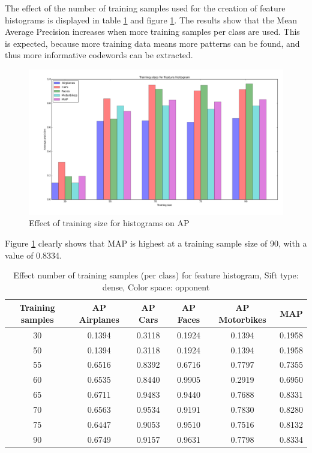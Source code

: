 The effect of the number of training samples used for the creation of feature histograms is displayed in table \ref{tab:size_hist} and figure \ref{fig:size_hist}. The results show that the Mean Average Precision increases when more training samples per class are used. This is expected, because more training data means more patterns can be found, and thus more informative codewords can be extracted.
\begin{figure}[H]
\includegraphics[width=\textwidth]{../plots/training_size_feature_histograms}
\caption{Effect of training size for histograms on AP}
\label{fig:size_hist}
\end{figure}
Figure \ref{fig:size_hist} clearly shows that MAP is highest at a training sample size of 90, with a value of 0.8334.

\begin{table}[H]
\begin{tabular}{|c|ccccc|}
\hline
\textbf{Training samples} & \textbf{AP Airplanes} & \textbf{AP Cars} & \textbf{AP Faces} & \textbf{AP Motorbikes} & \textbf{MAP}\\
\hline
30 & 0.1394 & 0.3118& 0.1924& 0.1394 & 0.1958\\
50 & 0.1394 & 0.3118& 0.1924& 0.1394 & 0.1958\\
55 & 0.6516 & 0.8392 & 0.6716 & 0.7797 & 0.7355\\
60 & 0.6535 & 0.8440 & 0.9905 & 0.2919 & 0.6950\\
65 & 0.6711 & 0.9483 & 0.9440 & 0.7688 & 0.8331\\
70 & 0.6563 & 0.9534 & 0.9191 & 0.7830 & 0.8280\\
75 & 0.6447 & 0.9053 & 0.9510 & 0.7516 & 0.8132\\
90 & 0.6749 & 0.9157 & 0.9631 & 0.7798 & 0.8334\\
\hline
\end{tabular}
\caption{Effect number of training samples (per class) for feature histogram, Sift type: dense, Color space: opponent}
\label{tab:size_hist}
\end{table}
